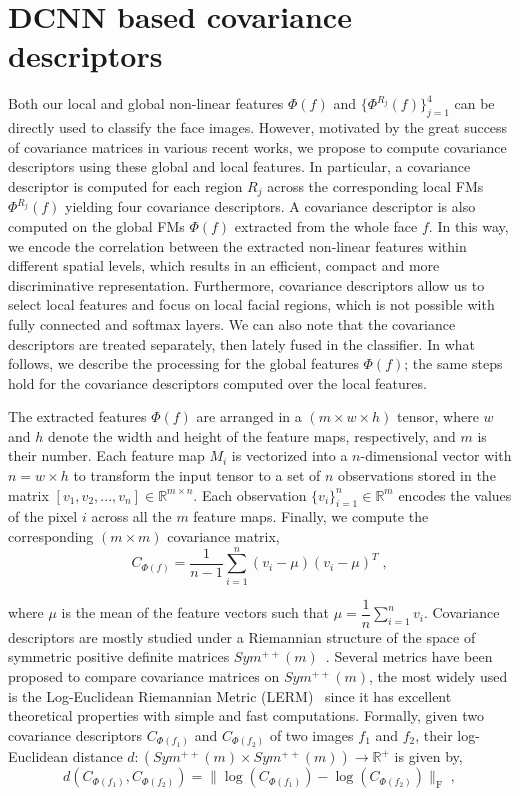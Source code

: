 \documentclass{bmvc2k}
\begin{document}
\section{DCNN based covariance descriptors}\label{sect:dcnn-covariance}
Both our local and global non-linear features $\Phi(f)$ and $\{\Phi^{R_{j}}(f)\}_{j=1}^{4}$ can be directly used to classify the face images. However, motivated by the great success of covariance matrices in various recent works, we propose to compute covariance descriptors using these global and local features. In particular, a covariance descriptor is computed for each region $R_{j}$ across the corresponding local FMs $\Phi^{R_{j}}(f)$ yielding four covariance descriptors. A covariance descriptor is also computed on the global FMs $\Phi(f)$ extracted from the whole face $f$. 
In this way, we encode the correlation between the extracted non-linear features within different spatial levels, which results in an efficient, compact and more discriminative representation. Furthermore, covariance descriptors allow us to select local features and focus on local facial regions, which is not possible with fully connected and softmax layers. We can also note that the covariance descriptors are treated separately, then lately fused in the classifier. In what follows, we describe the processing for the global features $\Phi(f)$; the same steps hold for the covariance descriptors computed over the local features.

The extracted features $\Phi(f)$ are arranged in a $(m \times w \times h )$ tensor, where $w$ and $h$ denote the width and height of the feature maps, respectively, and $m$ is their number. Each feature map $M_i$ is vectorized into a $n$-dimensional vector with $n=w\times h$ to transform the input tensor to a set of $n$ observations stored in the matrix $[v_{1}, v_{2},...,v_{n}] \in \mathbb{R}^{m \times n}$. Each observation $\{v_i\}^n_{i=1} \in \mathbb{R}^{m}$ encodes the values of the pixel $i$ across all the $m$ feature maps. Finally, we compute the corresponding $(m\times m)$ covariance matrix, 
\begin{equation}
\label{eq:covariance}
C_{\Phi(f)} = \dfrac{1}{n-1}\sum^{n}_{i=1} (v_{i}-\mu)(v_{i}-\mu)^{T} \; ,
\end{equation}

\noindent
where $\mu$ is the mean of the feature vectors such that $\mu=\dfrac{1}{n}\sum^{n}_{i=1}v_{i}$. Covariance descriptors are mostly studied under a Riemannian structure of the space of symmetric positive definite matrices $Sym^{++}(m)$~\cite{tuzel:2006,jayasumana2015kernel,wang2017discriminative}.
Several metrics have been proposed to compare covariance matrices on $Sym^{++}(m)$, the most widely used is the Log-Euclidean Riemannian Metric (LERM)~\cite{arsigny2006log} since it has excellent theoretical properties with simple and fast computations. 
Formally, given two covariance descriptors $C_{\Phi(f_1)}$ and $C_{\Phi(f_2)}$ of two images $f_{1}$ and $f_{2}$, their log-Euclidean distance $d: (Sym^{++}(m) \times Sym^{++}(m)) \rightarrow \mathbb{R}^{+}$ is given by,
\begin{equation}
\label{eq:LERM}
d(C_{\Phi(f_1)},C_{\Phi(f_2)})=\| \log(C_{\Phi(f_1)})-\log(C_{\Phi(f_2)} ) \|_{\textrm{F}} \; ,
\end{equation}
\end{document}
